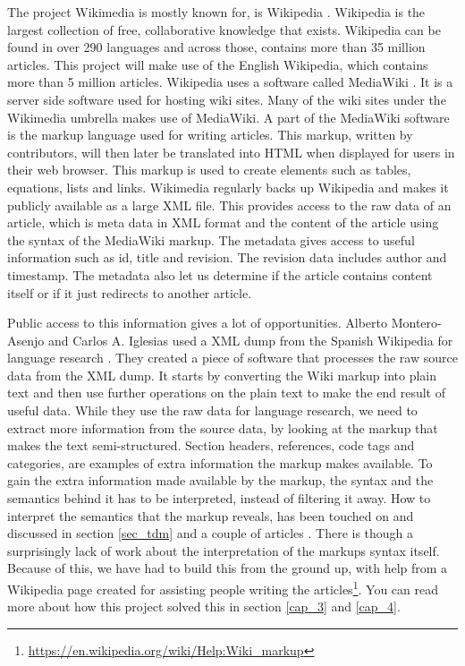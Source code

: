 The project Wikimedia is mostly known for, is Wikipedia \cite{wikipedia}. Wikipedia is the largest collection of free, collaborative knowledge that exists. Wikipedia can be found in over 290 languages and across those, contains more than 35 million articles. This project will make use of the English Wikipedia, which contains more than 5 million articles. Wikipedia uses a  software called MediaWiki \cite{mediawiki}. It is a server side software used for hosting wiki sites. Many of the wiki sites under the Wikimedia umbrella makes use of MediaWiki. A part of the MediaWiki software is the markup language used for writing articles. This markup, written by contributors, will then later be translated into HTML when displayed for users in their web browser. This markup is used to create elements such as tables, equations, lists and links. Wikimedia regularly backs up Wikipedia and makes it publicly available as a large XML file. This provides access to the raw data of an article, which is meta data in XML format and the content of the article using the syntax of the MediaWiki markup. The metadata gives access to useful information such as id, title and revision. The revision data includes author and timestamp. The metadata also let us determine if the article contains content itself or if it just redirects to another article.

Public access to this information gives a lot of opportunities. Alberto Montero-Asenjo and Carlos A. Iglesias used a XML dump from the Spanish Wikipedia for language research \cite{lr-wiki}. They created a piece of software that processes the raw source data from the XML dump. It starts by converting the Wiki markup into plain text and then use further operations on the plain text to make the end result of useful data. While they use the raw data for language research, we need to extract more information from the source data, by looking at the markup that makes the text semi-structured. Section headers, references, code tags and categories, are examples of extra information the markup makes available. 
To gain the extra information made available by the markup, the syntax and the semantics behind it has to be interpreted, instead of filtering it away.
How to interpret the semantics that the markup reveals, has been touched on and discussed in section \ref{sec_tdm} and a couple of articles \cite{text-cat} \cite{wlm}. There is though a surprisingly lack of work about the interpretation of the markups syntax itself. Because of this, we have had to build this from the ground up, with help from a Wikipedia page created for assisting people writing the articles\footnote{\url{https://en.wikipedia.org/wiki/Help:Wiki_markup}}. You can read more about how this project solved this in section \ref{cap_3} and \ref{cap_4}.

